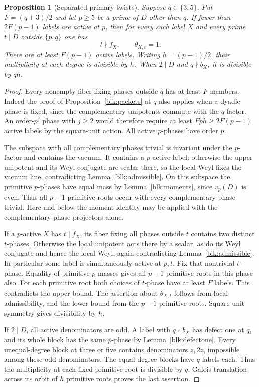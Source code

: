 \documentclass[11pt]{amsart}
\numberwithin{equation}{section}
\newtheorem{proposition}[theorem]{Proposition}
\theoremstyle{definition}
\theoremstyle{plain}
\begin{document}
\begin{proposition}[Separated primary twists]\label{new:separated-primary}
Suppose $q\in\{3,5\}$. Put $F=(q+3)/2$ and let $p\ge5$ be a prime
of $D$ other than $q$. If fewer than $2F(p-1)$ labels are active
at $p$, then for every such label $X$ and every prime $t\mid D$
outside $\{p,q\}$ one has
\[
              t\nmid f_X,\qquad \theta_{X,t}=1 .
\]
There are at least $F(p-1)$ active labels. Writing $h=(p-1)/2$,
their multiplicity at each degree is divisible by $h$. When $2\mid D$
and $q\nmid b_X$, it is divisible by $qh$.
\end{proposition}
\begin{proof}
Every nonempty fiber fixing phases outside $q$ has at least $F$
members. Indeed the proof of Proposition~\ref{blk:packets} at $q$
also applies when a dyadic phase is fixed, since the complementary
unipotents commute with the $q$-factor. An order-$p^j$ phase with
$j\ge2$ would therefore require at least $Fph\ge2F(p-1)$ active
labels by the square-unit action. All active $p$-phases have order $p$.

The subspace with all complementary phases trivial is invariant under
the $p$-factor and contains the vacuum. It contains a $p$-active label:
otherwise the upper unipotent and its Weyl conjugate are scalar
there, so the local Weyl fixes the vacuum line, contradicting
Lemma~\ref{blk:admissible}. On this subspace the primitive $p$-phases
have equal mass by Lemma~\ref{blk:moments}, since $v_p(D)$ is even.
Thus all $p-1$ primitive roots occur with every complementary phase
trivial. Here and below the moment identity may be applied with
the complementary phase projectors alone.

If a $p$-active $X$ has $t\mid f_X$, its fiber fixing all phases
outside $t$ contains two distinct $t$-phases. Otherwise the local
unipotent acts there by a scalar, as do its Weyl conjugate and hence
the local Weyl, again contradicting Lemma~\ref{blk:admissible}.
In particular some label is simultaneously active at $p,t$.
Fix that nontrivial $t$-phase. Equality of primitive $p$-masses gives
all $p-1$ primitive roots in this phase also. For each primitive root
both choices of $t$-phase have at least $F$ labels. This contradicts
the upper bound. The assertion about $\theta_{X,t}$ follows from
local admissibility, and the lower bound from the $p-1$ primitive
roots. Square-unit symmetry gives divisibility by $h$.

If $2\mid D$, all active denominators are odd. A label with $q\nmid b_X$
has defect one at $q$, and its whole block has the same $p$-phase by
Lemma~\ref{blk:defectone}. Every unequal-degree block at three or five
contains denominators $z,2z$, impossible among these odd denominators.
The equal-degree blocks have $q$ labels each. Thus the multiplicity
at each fixed primitive root is divisible by $q$. Galois translation
across its orbit of $h$ primitive roots proves the last assertion.
\end{proof}
\end{document}
